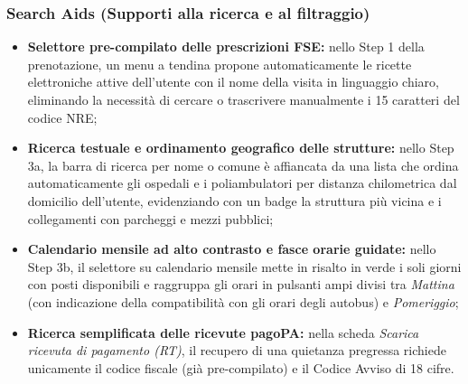 \subsubsection{Search Aids (Supporti alla ricerca e al filtraggio)}
\begin{itemize}
\item \textbf{Selettore pre-compilato delle prescrizioni FSE:} nello Step 1 della prenotazione, un menu a tendina propone automaticamente le ricette elettroniche attive dell'utente con il nome della visita in linguaggio chiaro, eliminando la necessità di cercare o trascrivere manualmente i 15 caratteri del codice NRE;
\item \textbf{Ricerca testuale e ordinamento geografico delle strutture:} nello Step 3a, la barra di ricerca per nome o comune è affiancata da una lista che ordina automaticamente gli ospedali e i poliambulatori per distanza chilometrica dal domicilio dell'utente, evidenziando con un badge la struttura più vicina e i collegamenti con parcheggi e mezzi pubblici;
\item \textbf{Calendario mensile ad alto contrasto e fasce orarie guidate:} nello Step 3b, il selettore su calendario mensile mette in risalto in verde i soli giorni con posti disponibili e raggruppa gli orari in pulsanti ampi divisi tra \emph{Mattina} (con indicazione della compatibilità con gli orari degli autobus) e \emph{Pomeriggio};
\item \textbf{Ricerca semplificata delle ricevute pagoPA:} nella scheda \emph{Scarica ricevuta di pagamento (RT)}, il recupero di una quietanza pregressa richiede unicamente il codice fiscale (già pre-compilato) e il Codice Avviso di 18 cifre.
\end{itemize}

